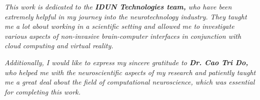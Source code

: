 \begin{dedication}

    \textit{This work is dedicated to the \textbf{IDUN Technologies team,} who have been extremely helpful in my journey into the neurotechnology industry. They taught me a lot about working in a scientific setting and allowed me to investigate various aspects of non-invasive brain-computer interfaces in conjunction with cloud computing and virtual reality.}

    \hfill \break

    \textit{Additionally, I would like to express my sincere gratitude to \textbf{Dr. Cao Tri Do,} who helped me with the neuroscientific aspects of my research and patiently taught me a great deal about the field of computational neuroscience, which was essential for completing this work.}

\end{dedication}
